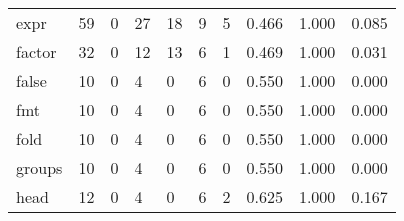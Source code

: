 \begin{longtable}{lp{2.0cm}p{2.0cm}p{2.0cm}p{2.0cm}p{2.0cm}p{2.0cm}p{2.0cm}p{2.0cm}p{2.0cm}}
expr      &                     59 &                                             0 &                                           27 &                                          18 &                                            9 &                                          5 &                                0.466 &                                  1.000 &                                0.085 \\
factor    &                     32 &                                             0 &                                           12 &                                          13 &                                            6 &                                          1 &                                0.469 &                                  1.000 &                                0.031 \\
false     &                     10 &                                             0 &                                            4 &                                           0 &                                            6 &                                          0 &                                0.550 &                                  1.000 &                                0.000 \\
fmt       &                     10 &                                             0 &                                            4 &                                           0 &                                            6 &                                          0 &                                0.550 &                                  1.000 &                                0.000 \\
fold      &                     10 &                                             0 &                                            4 &                                           0 &                                            6 &                                          0 &                                0.550 &                                  1.000 &                                0.000 \\
groups    &                     10 &                                             0 &                                            4 &                                           0 &                                            6 &                                          0 &                                0.550 &                                  1.000 &                                0.000 \\
head      &                     12 &                                             0 &                                            4 &                                           0 &                                            6 &                                          2 &                                0.625 &                                  1.000 &                                0.167 \\

\end{longtable}
